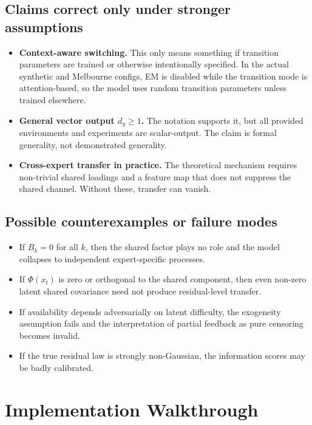 \documentclass[11pt]{article}
\begin{document}
\subsection{Claims correct only under stronger assumptions}

\begin{itemize}
    \item \textbf{Context-aware switching.} This only means something if
    transition parameters are trained or otherwise intentionally specified. In
    the actual synthetic and Melbourne configs, EM is disabled while the
    transition mode is attention-based, so the model uses random transition
    parameters unless trained elsewhere.

    \item \textbf{General vector output $d_y \ge 1$.} The notation supports it,
    but all provided environments and experiments are scalar-output. The claim is
    formal generality, not demonstrated generality.

    \item \textbf{Cross-expert transfer in practice.} The theoretical mechanism
    requires non-trivial shared loadings and a feature map that does not suppress
    the shared channel. Without these, transfer can vanish.
\end{itemize}

\subsection{Possible counterexamples or failure modes}

\begin{itemize}
    \item If $B_k = 0$ for all $k$, then the shared factor plays no role and the
    model collapses to independent expert-specific processes.
    \item If $\Phi(x_t)$ is zero or orthogonal to the shared component, then even
    non-zero latent shared covariance need not produce residual-level transfer.
    \item If availability depends adversarially on latent difficulty, the
    exogeneity assumption fails and the interpretation of partial feedback as
    pure censoring becomes invalid.
    \item If the true residual law is strongly non-Gaussian, the information
    scores may be badly calibrated.
\end{itemize}

\section{Implementation Walkthrough}
\end{document}

